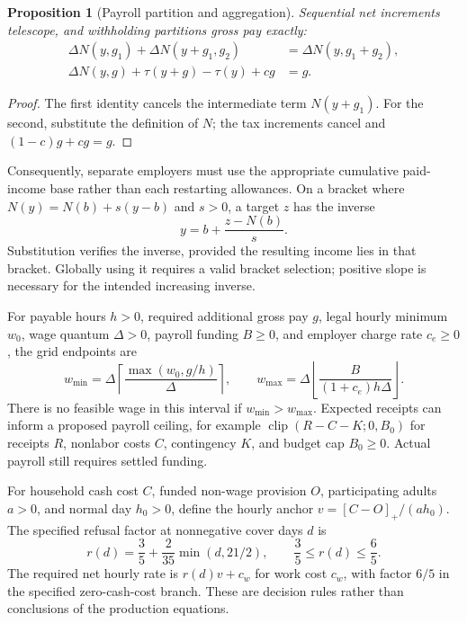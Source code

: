 \documentclass[11pt,a4paper]{article}
\newtheorem{proposition}[theorem]{Proposition}
\begin{document}
\begin{proposition}[Payroll partition and aggregation]
Sequential net increments telescope, and withholding partitions gross pay exactly:
\begin{equation}
\begin{aligned}
\Delta N(y,g_1)+\Delta N(y+g_1,g_2)&=\Delta N(y,g_1+g_2),\\
\Delta N(y,g)+\tau(y+g)-\tau(y)+cg&=g.
\end{aligned}
\end{equation}
\end{proposition}
\begin{proof}
The first identity cancels the intermediate term $N(y+g_1)$. For the second, substitute the definition of $N$; the tax increments cancel and $(1-c)g+cg=g$.
\end{proof}

Consequently, separate employers must use the appropriate cumulative paid-income base rather than each restarting allowances. On a bracket where $N(y)=N(b)+s(y-b)$ and $s>0$, a target $z$ has the inverse
\begin{equation}
y=b+\frac{z-N(b)}s.
\end{equation}
Substitution verifies the inverse, provided the resulting income lies in that bracket. Globally using it requires a valid bracket selection; positive slope is necessary for the intended increasing inverse.

For payable hours $h>0$, required additional gross pay $g$, legal hourly minimum $w_0$, wage quantum $\Delta>0$, payroll funding $B\geq0$, and employer charge rate $c_e\geq0$, the grid endpoints are
\begin{equation}
w_{\min}=\Delta\left\lceil\frac{\max(w_0,g/h)}\Delta\right\rceil,
\qquad
w_{\max}=\Delta\left\lfloor\frac{B}{(1+c_e)h\Delta}\right\rfloor.
\end{equation}
There is no feasible wage in this interval if $w_{\min}>w_{\max}$. Expected receipts can inform a proposed payroll ceiling, for example $\operatorname{clip}(R-C-K;0,B_0)$ for receipts $R$, nonlabor costs $C$, contingency $K$, and budget cap $B_0\geq0$. Actual payroll still requires settled funding.

For household cash cost $C$, funded non-wage provision $O$, participating adults $a>0$, and normal day $h_0>0$, define the hourly anchor $v=[C-O]_+/(ah_0)$. The specified refusal factor at nonnegative cover days $d$ is
\begin{equation}
r(d)=\frac35+\frac2{35}\min(d,21/2),\qquad \frac35\leq r(d)\leq\frac65.
\end{equation}
The required net hourly rate is $r(d)v+c_w$ for work cost $c_w$, with factor $6/5$ in the specified zero-cash-cost branch. These are decision rules rather than conclusions of the production equations.
\end{document}
